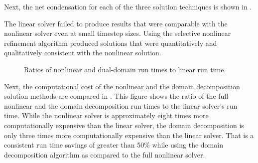 Next, the net condensation for each of the three solution techniques is shown in .

The linear solver failed to produce results that were comparable with the nonlinear solver even at small timestep sizes.
Using the selective nonlinear refinement algorithm produced solutions that were quantitatively and qualitatively consistent with the nonlinear solution.

\begin{figure}[h!tb]
\centering

\caption{Ratios of nonlinear and dual-domain run times to linear run time.}
\label{fig:refillRunTimeRatios}
\end{figure}

Next, the computational cost of the nonlinear and the domain decomposition solution methods are compared in .
This figure shows the ratio of the full nonlinear and the domain decomposition run times to the linear solver's run time.
While the nonlinear solver is approximately eight times more computationally expensive than the linear solver, the domain decomposition is only three times more computationally expensive than the linear solver.
That is a consistent run time savings of greater than 50\% while using the domain decomposition algorithm as compared to the full nonlinear solver.